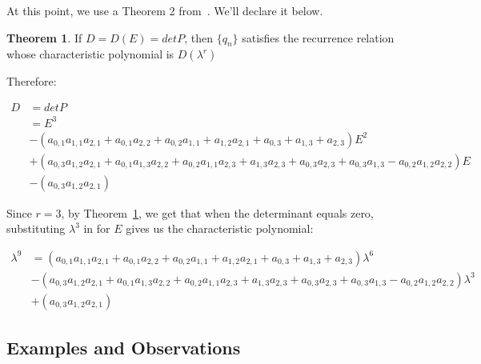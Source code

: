 \documentclass[a4paper]{article}
\theoremstyle{definition}
\newtheorem{theorem}{Theorem}[section]
\begin{document}
At this point, we use a Theorem 2 from~\cite{bib:gen_cond_rec}. We'll declare it below.
\\

\begin{theorem}
If $D=D(E)=detP$, then $\{q_n\}$  satisfies the recurrence relation whose characteristic polynomial is
$D(\lambda^r)$
\label{thm:det-is-char-poly-dxr}
\end{theorem}

Therefore:

\begin{align*}
D
&=detP \\
&=E^3 \\
&- (a_{0,1}a_{1,1}a_{2,1}+a_{0,1}a_{2,2}+a_{0,2}a_{1,1}+a_{1,2}a_{2,1}+a_{0,3}+a_{1,3}+a_{2,3})E^2 \\
&+ (a_{0,3}a_{1,2}a_{2,1}+a_{0,1}a_{1,3}a_{2,2}+a_{0,2}a_{1,1}a_{2,3}+a_{1,3}a_{2,3}+a_{0,3}a_{2,3}+a_{0,3}a_{1,3}-a_{0,2}a_{1,2}a_{2,2})E \\
&-(a_{0,3}a_{1,2}a_{2,1})
\end{align*}

Since $r=3$, by Theorem~\ref{thm:det-is-char-poly-dxr}, we get that when the determinant equals zero,
substituting $\lambda^3$ in for $E$ gives us the characteristic polynomial:

\begin{align*}
\lambda^9
&= (a_{0,1}a_{1,1}a_{2,1}+a_{0,1}a_{2,2}+a_{0,2}a_{1,1}+a_{1,2}a_{2,1}+a_{0,3}+a_{1,3}+a_{2,3})\lambda^6 \\
&- (a_{0,3}a_{1,2}a_{2,1}+a_{0,1}a_{1,3}a_{2,2}+a_{0,2}a_{1,1}a_{2,3}+a_{1,3}a_{2,3}+a_{0,3}a_{2,3}+a_{0,3}a_{1,3}-a_{0,2}a_{1,2}a_{2,2})\lambda^3 \\
&+(a_{0,3}a_{1,2}a_{2,1})
\end{align*}

\subsection{Examples and Observations}
\end{document}
